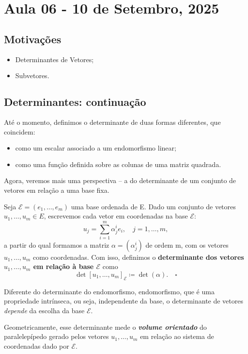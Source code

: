 \documentclass[../differential_forms.tex]{subfiles}
\begin{document}
\section{Aula 06 - 10 de Setembro, 2025}
\subsection{Motivações}
\begin{itemize}
	\item Determinantes de Vetores;
	\item Subvetores.
\end{itemize}
\subsection{Determinantes: continuação}
Até o momento, definimos o determinante de duas formas diferentes, que coincidem:
\begin{itemize}
	\item como um escalar associado a um endomorfismo linear;
	\item como uma função definida sobre as colunas de uma matriz quadrada.
\end{itemize}
Agora, veremos mais uma perspectiva -- a do determinante de um conjunto de vetores em relação a uma base fixa.
\begin{def*}
	Seja \(\mathcal{E}=(e_1,\dotsc , e_{m})\) uma base ordenada de E. Dado um conjunto de vetores \(u_1, \dotsc , u_{m}\in E\), escrevemos cada vetor em coordenadas na base \(\mathcal{E}:\)
	\[
		u_{j}=\sum\limits_{i=1}^{m} \alpha_{j}^{i}e_{i},\quad j=1,\dotsc ,m,
	\]
	a partir do qual formamos a matriz \(\alpha =(\alpha_{j}^{i})\) de ordem m, com os vetores \(u_1,\dotsc , u_{m}\) como coordenadas. Com isso, definimos o \textbf{determinante dos vetores \(u_1,\dotsc , u_{m}\) em relação à base \(\mathcal{E}\)} como
	\[
		\det{[u_{1},\dotsc , u_{m}]}_{\mathcal{E}}\coloneqq \det{(\alpha )}. \quad \square
	\]
\end{def*}
\begin{tcolorbox}[
		skin=enhanced,
		title=Observação,
		fonttitle=\bfseries,
		colframe=black,
		colbacktitle=cyan!75!white,
		colback=cyan!15,
		colbacklower=black,
		coltitle=black,
		drop fuzzy shadow,
	]
	Diferente do determinante do endomorfismo, endomorfismo, que é uma propriedade intrínseca, ou seja, independente da base, o determinante de vetores \textit{depende} da escolha da base \(\mathcal{E}.\)

	Geometricamente, esse determinante mede o \textit{\textbf{volume orientado}} do paralelepípedo gerado pelos vetores \(u_1,\dotsc , u_{m}\) em relação ao sistema de coordenadas dado por \(\mathcal{E}.\)
\end{tcolorbox}
\end{document}
